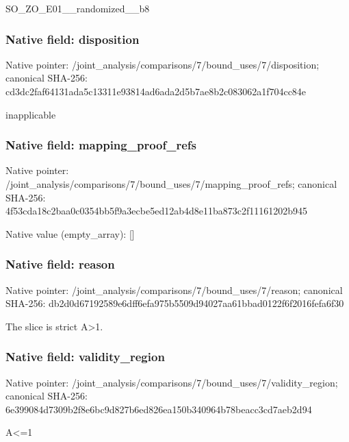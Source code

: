 \documentclass[10pt,a4paper]{article}
\begin{document}
\begingroup\raggedright\sloppy SO\_\allowbreak{}ZO\_\allowbreak{}E01\_\allowbreak{}\_\allowbreak{}randomized\_\allowbreak{}\_\allowbreak{}b8\par\endgroup

\subsubsection{Native field: disposition}
Native pointer: /joint\_\allowbreak{}analysis/comparisons/7/bound\_\allowbreak{}uses/7/disposition; canonical SHA-256: cd3dc2faf64131ada5c13311e93814ad6ada2d5b7ae8b2c083062a1f704cc84e

\begingroup\raggedright\sloppy inapplicable\par\endgroup

\subsubsection{Native field: mapping\_\allowbreak{}proof\_\allowbreak{}refs}
Native pointer: /joint\_\allowbreak{}analysis/comparisons/7/bound\_\allowbreak{}uses/7/mapping\_\allowbreak{}proof\_\allowbreak{}refs; canonical SHA-256: 4f53cda18c2baa0c0354bb5f9a3ecbe5ed12ab4d8e11ba873c2f11161202b945

Native value (empty\_\allowbreak{}array): []

\subsubsection{Native field: reason}
Native pointer: /joint\_\allowbreak{}analysis/comparisons/7/bound\_\allowbreak{}uses/7/reason; canonical SHA-256: db2d0d67192589e6dff6efa975b5509d94027aa61bbad0122f6f2016fefa6f30

\begingroup\raggedright\sloppy The slice is strict A>1.\par\endgroup

\subsubsection{Native field: validity\_\allowbreak{}region}
Native pointer: /joint\_\allowbreak{}analysis/comparisons/7/bound\_\allowbreak{}uses/7/validity\_\allowbreak{}region; canonical SHA-256: 6e399084d7309b2f8e6bc9d827b6ed826ea150b340964b78beacc3cd7aeb2d94

\begingroup\raggedright\sloppy A<=\allowbreak{}1\par\endgroup
\end{document}
